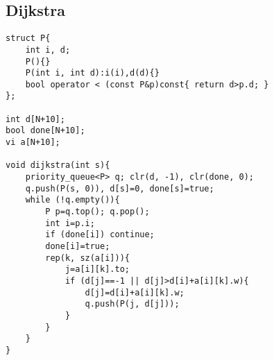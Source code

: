 \subsection{Dijkstra}
\begin{lstlisting}
struct P{
	int i, d;
	P(){}
	P(int i, int d):i(i),d(d){}
	bool operator < (const P&p)const{ return d>p.d; }
};

int d[N+10];
bool done[N+10];
vi a[N+10];

void dijkstra(int s){
	priority_queue<P> q; clr(d, -1), clr(done, 0);
	q.push(P(s, 0)), d[s]=0, done[s]=true;
	while (!q.empty()){
		P p=q.top(); q.pop();
		int i=p.i;
		if (done[i]) continue;
		done[i]=true;
		rep(k, sz(a[i])){
			j=a[i][k].to;
			if (d[j]==-1 || d[j]>d[i]+a[i][k].w){
				d[j]=d[i]+a[i][k].w;
				q.push(P(j, d[j]));
			}
		}
	}
}
\end{lstlisting}
